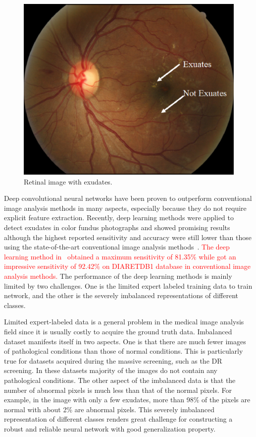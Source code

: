 \documentclass{osa-article}
\begin{document}
\begin{figure}[ht]
\centering
\includegraphics[width=0.8\linewidth]{display2.eps}
\caption{Retinal image with exudates.}
\label{fig:exudates}
\end{figure}

Deep convolutional neural networks have been proven to outperform conventional image analysis methods in many aspects, especially because they do not require explicit feature extraction. Recently, deep learning methods were applied to detect exudates in color fundus photographs and showed promising results although the highest reported sensitivity and accuracy were still lower than those using the state-of-the-art conventional image analysis methods~\cite{feng2017deep,pereira2015exudate, tan2017automated}. \textcolor{red}{The deep learning method in~\cite{feng2017deep} obtained a maximum sensitivity of 81.35\% while \cite{fraz2017multiscale} got an impressive sensitivity of 92.42\% on DIARETDB1 database in conventional image analysis methods.} The performance of the deep learning methods is mainly limited by two challenges. One is the limited expert labeled training data to train network, and the other is the severely imbalanced representations of different classes.

Limited expert-labeled data is a general problem in the medical image analysis field since it is usually costly to acquire the ground truth data. Imbalanced dataset manifests itself in two aspects. One is that there are much fewer images of pathological conditions than those of normal conditions. This is particularly true for datasets acquired during the massive screening, such as the DR screening. In these datasets majority of the images do not contain any pathological conditions. The other aspect of the imbalanced data is that the number of abnormal pixels is much less than that of the normal pixels. For example, in the image with only a few exudates, more than 98\% of the pixels are normal with about 2\% are abnormal pixels. This severely imbalanced representation of different classes renders great challenge for constructing a robust and reliable neural network with good generalization property.
\end{document}
